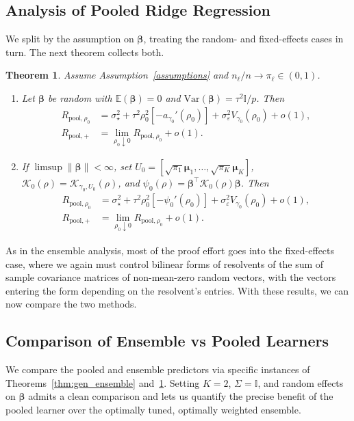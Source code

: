 \documentclass{article}
\theoremstyle{plain}
\newtheorem{theorem}{Theorem}[section]
\theoremstyle{remark}
\def \bbeta{\boldsymbol{\beta}}
\def \bbeta{\boldsymbol{\beta}}
\def \I{\mathcal{I}}
\def \E{\mathbb{E}}
\def \bmu{\pmb{\mu}}
\def \I {\mathbb{I}}
\begin{document}
\subsection{Analysis of Pooled Ridge Regression}\label{sec:pooled}
We split by the assumption on $\boldsymbol{\beta}$, treating the random- and fixed-effects cases in turn. The next theorem collects both.

\begin{theorem}\label{thm:Pooled}
Assume Assumption~\ref{assumptions} and $n_\ell/n\to\pi_\ell\in(0,1)$.
\begin{enumerate}
\item\label{thm:Pooled_re} Let $\bbeta$ be random with $\E(\bbeta)=0$ and $\mathrm{Var}(\bbeta)=\tau^2\I/p$.  Then
\begin{align*}
R_{\mathrm{pool},\rho_0}
&=\sigma_\star^2
+\tau^2\rho_0^2[-a_{\gamma_0}'(\rho_0)]
+\sigma_\varepsilon^2 V_{\gamma_0}(\rho_0)+o(1),\\
R_{\mathrm{pool},+}
&=\lim_{\rho_0\downarrow 0}R_{\mathrm{pool},\rho_0}+o(1).
\end{align*}

\item\label{thm:Pooled_fe} If $\limsup\|\bbeta\|<\infty$, set $U_0=[\sqrt{\pi_1}\bmu_1,\ldots,\sqrt{\pi_K}\bmu_K]$, $\mathcal K_0(\rho)=\mathcal K_{\gamma_0,U_0}(\rho)$, and $\psi_0(\rho)=\bbeta^\top\mathcal K_0(\rho)\bbeta$. Then
\begin{align*}
R_{\mathrm{pool},\rho_0}
&=\sigma_\star^2
+\tau^2\rho_0^2[-\psi_0'(\rho_0)]
+\sigma_\varepsilon^2 V_{\gamma_0}(\rho_0)+o(1),\\
R_{\mathrm{pool},+}
&=\lim_{\rho_0\downarrow 0}R_{\mathrm{pool},\rho_0}+o(1).
\end{align*}
\end{enumerate}
\end{theorem}

As in the ensemble analysis, most of the proof effort goes into the fixed-effects case, where we again must control bilinear forms of resolvents of the sum of sample covariance matrices of non-mean-zero random vectors, with the vectors entering the form depending on the resolvent's entries. With these results, we can now compare the two methods.

\subsection{Comparison of Ensemble vs Pooled Learners}\label{sec:compare}
We compare the pooled and ensemble predictors via specific instances of Theorems~\ref{thm:gen_ensemble} and~\ref{thm:Pooled}. Setting $K=2$, $\Sigma=\I$, and random effects on $\boldsymbol{\beta}$ admits a clean comparison and lets us quantify the precise benefit of the pooled learner over the optimally tuned, optimally weighted ensemble.
\end{document}

